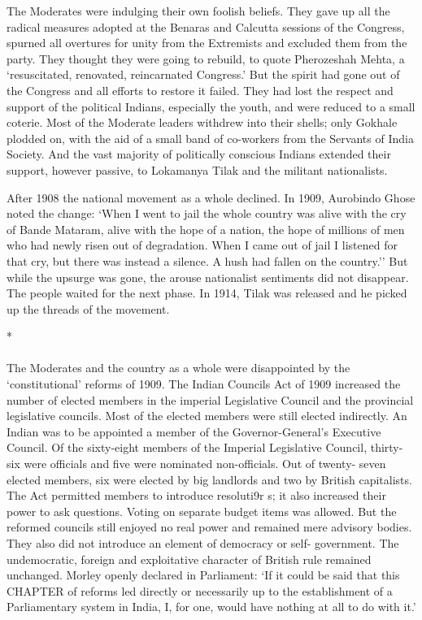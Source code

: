 The Moderates were indulging their own foolish beliefs. They gave up all the radical measures adopted at the Benaras and Calcutta sessions of the Congress, spurned all overtures for unity from the Extremists and excluded them from the party. They thought they were going to rebuild, to quote Pherozeshah Mehta, a `resuscitated, renovated, reincarnated Congress.' But the spirit had gone out of the Congress and all efforts to restore it failed. They had lost the respect and support of the political Indians, especially the youth, and were reduced to a small coterie. Most of the Moderate leaders withdrew into their shells; only Gokhale plodded on, with the aid of a small band of co-workers from the Servants of India Society. And the vast majority of politically conscious Indians extended their support, however passive, to Lokamanya Tilak and the militant nationalists.

After 1908 the national movement as a whole declined. In 1909, Aurobindo Ghose noted the change: `When I went to jail the whole country was alive with the cry of Bande Mataram, alive with the hope of a nation, the hope of millions of men who had newly risen out of degradation. When I came out of jail I listened for that cry, but there was instead a silence. A hush had fallen on the country.'' But while the upsurge was gone, the arouse nationalist sentiments did not disappear. The people waited for the next phase. In 1914, Tilak was released and he picked up the threads of the movement.

\begin{center}*\end{center}

\paragraph*{}

The Moderates and the country as a whole were disappointed by the `constitutional' reforms of 1909. The Indian Councils Act of 1909 increased the number of elected members in the imperial Legislative Council and the provincial legislative councils. Most of the elected members were still elected indirectly. An Indian was to be appointed a member of the Governor-General's Executive Council. Of the sixty-eight members of the Imperial Legislative Council, thirty-six were officials and five were nominated non-officials. Out of twenty- seven elected members, six were elected by big landlords and two by British capitalists. The Act permitted members to introduce resoluti9r s; it also increased their power to ask questions. Voting on separate budget items was allowed. But the reformed councils still enjoyed no real power and remained mere advisory bodies. They also did not introduce an element of democracy or self- government. The undemocratic, foreign and exploitative character of British rule remained unchanged. Morley openly declared in Parliament: `If it could be said that this CHAPTER of reforms led directly or necessarily up to the establishment of a Parliamentary system in India, I, for one, would have nothing at all to do with it.'

